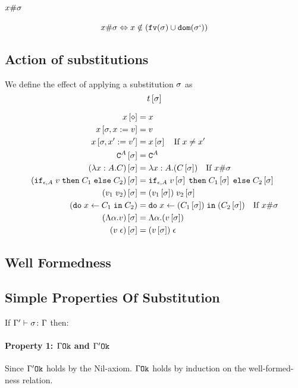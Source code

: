 \documentclass{report}
\begin{document}
\paragraph{$x \# \sigma$}
\begin{equation}
    x \# \sigma \Leftrightarrow x\notin(\texttt{fv}(\sigma)\cup\texttt{dom}(\sigma`))
\end{equation}

\subsection{Action of substitutions}
    We define the effect of applying a substitution $\sigma$ as 
    $$t\left[\sigma\right]$$

    
    \begin{align}
        x\left[\diamond\right] & = x \\
        x\left[\sigma,x:= v\right] & = v \\
        x\left[\sigma,x':= v'\right] & = x\left[\sigma\right]\quad\text{If }x \neq x'\\
        \texttt{C}^{A}\left[\sigma\right] & = \texttt{C}^{A} \\
        (\lambda x : A. C)\left[\sigma\right] &= \lambda x : A. (C\left[\sigma\right])\quad\text{If }x\#\sigma\\
        (\texttt{if}_{\epsilon, A}\; v\; \texttt{then}\; C_1 \;\texttt{else} \; C_2)\left[\sigma\right] &= \texttt{if}_{\epsilon, A}\; v\left[\sigma\right]\; \texttt{then}\; C_1\left[\sigma\right] \;\texttt{else} \; C_2\left[\sigma\right]\\
        (v_1\; v_2)\left[\sigma\right]&= (v_1\left[\sigma\right])\; v_2\left[\sigma\right]\\
        (\texttt{do}\; x \leftarrow C_1 \;\texttt{in}\; C_2)&= \texttt{do}\; x \leftarrow (C_1\left[\sigma\right]) \;\texttt{in}\; (C_2\left[\sigma\right])\quad\text{If } x\#\sigma\\
        (\Lambda \alpha. v)\left[\sigma\right] & = \Lambda \alpha. (v\left[\sigma\right])\\
        (v\;\epsilon)\left[\sigma\right] & = (v\left[\sigma\right])\;\epsilon\\
    \end{align}
\subsection{Well Formedness}

\subsection{Simple Properties Of Substitution}
If $\Gamma' \vdash \sigma \colon \Gamma$ then:

    \paragraph{Property 1: $\Gamma \texttt{Ok}$ and $\Gamma' \texttt{Ok}$}
     Since $\Gamma' \texttt{Ok}$ holds by the Nil-axiom. $\Gamma \texttt{Ok}$ holds by induction on the well-formed-ness relation.
\end{document}
